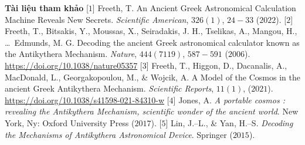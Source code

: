 \begin{multicols}{2}
	\vskip 0.1cm
	\textbf{\color{lichsutoanhoc}Tài liệu tham khảo}
	\vskip 0.1cm
	[$1$] Freeth, T. An Ancient Greek Astronomical Calculation Machine Reveals New Secrets. \textit{Scientific American}, $326(1)$, $24-33$ ($2022$).
	\vskip 0.1cm
	[$2$] Freeth, T., Bitsakis, Y., Moussas, X., Seiradakis, J. H., Tselikas, A., Mangou, H., \ldots\, Edmunds, M. G. Decoding the ancient Greek astronomical calculator known as the Antikythera Mechanism. \textit{Nature}, $444(7119)$, $587-591$ ($2006$). \url{https://doi.org/10.1038/nature05357}
	\vskip 0.1cm
	[$3$] Freeth, T., Higgon, D., Dacanalis, A., MacDonald, L., Georgakopoulou, M., \& Wojcik, A. A Model of the Cosmos in the ancient Greek Antikythera Mechanism. \textit{Scientific Reports}, $11(1)$, ($2021$). \url{https://doi.org/10.1038/s41598-021-84310-w}
	\vskip 0.1cm
	[$4$] Jones, A. \textit{A portable cosmos : revealing the Antikythera Mechanism, scientific wonder of the ancient world}. New York, Ny: Oxford University Press  ($2017$).
	\vskip 0.1cm
	[$5$] Lin, J.--L., \& Yan, H.--S. \textit{Decoding the Mechanisms of Antikythera Astronomical Device}. Springer ($2015$).
\end{multicols}